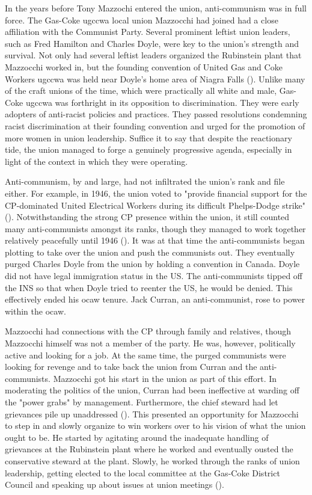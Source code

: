 \documentclass[12pt]{article}
\begin{document}
In the years before Tony Mazzochi entered the union, anti-communism was in full force. The Gas-Coke \acrshort{ugccwa} local union Mazzocchi had joined had a close affiliation with the Communist Party. Several prominent leftist union leaders, such as Fred Hamilton and Charles Doyle, were key to the union’s strength and survival. Not only had several leftist leaders organized the Rubinstein plant that Mazzocchi worked in, but the founding convention of United Gas and Coke Workers \acrshort{ugccwa} was held near Doyle’s home area of Niagra Falls (\cite[81]{leopoldManWhoHated2007}). Unlike many of the craft unions of the time, which were practically all white and male, Gas-Coke \acrshort{ugccwa} was forthright in its opposition to discrimination. They were early adopters of anti-racist policies and practices. They passed resolutions condemning racist discrimination at their founding convention and urged for the promotion of more women in union leadership. Suffice it to say that despite the reactionary tide, the union managed to forge a genuinely progressive agenda, especially in light of the context in which they were operating.

Anti-communism, by and large, had not infiltrated the union’s rank and file either. For example, in 1946, the union voted to "provide financial support for the CP-dominated United Electrical Workers during its difficult Phelps-Dodge strike" (\cite[84]{leopoldManWhoHated2007}). Notwithstanding the strong CP presence within the union, it still counted many anti-communists amongst its ranks, though they managed to work together relatively peacefully until 1946 (\cite[84]{leopoldManWhoHated2007}). It was at that time the anti-communists began plotting to take over the union and push the communists out. They eventually purged Charles Doyle from the union by holding a convention in Canada. Doyle did not have legal immigration status in the US. The anti-communists tipped off the INS so that when Doyle tried to reenter the US, he would be denied. This effectively ended his \acrshort{ocaw} tenure. Jack Curran, an anti-communist, rose to power within the \acrshort{ocaw}.

Mazzocchi had connections with the CP through family and relatives, though Mazzocchi himself was not a member of the party. He was, however, politically active and looking for a job. At the same time, the purged communists were looking for revenge and to take back the union from Curran and the anti-communists. Mazzocchi got his start in the union as part of this effort. In moderating the politics of the union, Curran had been ineffective at warding off the "power grabs" by management. Furthermore, the chief steward had let grievances pile up unaddressed (\cite[90]{leopoldManWhoHated2007}). This presented an opportunity for Mazzocchi to step in and slowly organize to win workers over to his vision of what the union ought to be. He started by agitating around the inadequate handling of grievances at the Rubinstein plant where he worked and eventually ousted the conservative steward at the plant. Slowly, he worked through the ranks of union leadership, getting elected to the local committee at the Gas-Coke District Council and speaking up about issues at union meetings (\cite[97--98]{leopoldManWhoHated2007}). 
\end{document}
